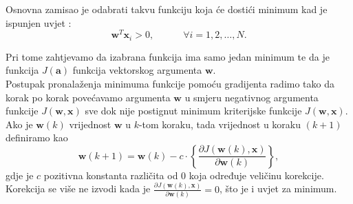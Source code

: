 \documentclass{book}
\begin{document}
Osnovna zamisao je odabrati takvu funkciju koja će dostići minimum kad je
ispunjen uvjet :
$$ \mathbf{w}^T\mathbf{x}_i > 0, \quad \quad \quad \forall i = 1,2,\ldots,N. $$

Pri tome zahtjevamo da izabrana funkcija ima samo jedan minimum te da je
funkcija $J(\mathbf{a})$ funkcija vektorskog argumenta $\mathbf{w}$. \\

Postupak pronalaženja minimuma funkcije pomoću gradijenta radimo tako da korak
po korak povećavamo argumenta $\mathbf{w}$ u smjeru negativnog argumenta
funkcije $J(\mathbf{w}, \mathbf{x})$ sve dok nije postignut minimum kriterijske
funkcije $J(\mathbf{w}, \mathbf{x})$. \\

Ako je $\mathbf{w}(k)$ vrijednost $\mathbf{w}$ u $k$-tom koraku, tada vrijednost
u koraku $(k+1)$ definiramo kao 
$$ \mathbf{w}(k+1) = \mathbf{w}(k) - c \cdot \left \{ \frac{\partial
J(\mathbf{w}(k), \mathbf{x})}{\partial \mathbf{w}(k)} \right \}, $$
gdje je $c$ pozitivna konstanta različita od 0 koja određuje veličinu
korekcije.\\

Korekcija se više ne izvodi kada je $\frac{\partial
J(\mathbf{w}(k), \mathbf{x})}{\partial \mathbf{w}(k)} = 0$, što je i uvjet za
minimum. \\
\end{document}
